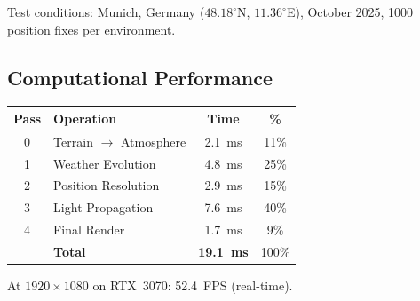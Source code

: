 \documentclass[10pt,twocolumn]{article}
\theoremstyle{definition}
\theoremstyle{remark}
\begin{document}
Test conditions: Munich, Germany
($48.18^\circ$N, $11.36^\circ$E), October 2025, 1000
position fixes per environment.

\subsection{Computational Performance}\label{sec:perfval}

\begin{center}
\small
\begin{tabular}{@{}clcc@{}}
\toprule
\textbf{Pass} & \textbf{Operation} & \textbf{Time}
  & \textbf{\%}\\
\midrule
0 & Terrain $\to$ Atmosphere & 2.1~ms & 11\%\\
1 & Weather Evolution & 4.8~ms & 25\%\\
2 & Position Resolution & 2.9~ms & 15\%\\
3 & Light Propagation & 7.6~ms & 40\%\\
4 & Final Render & 1.7~ms & 9\%\\
\midrule
& \textbf{Total} & \textbf{19.1~ms} & 100\%\\
\bottomrule
\end{tabular}
\end{center}

At $1920\times 1080$ on RTX~3070: 52.4~FPS (real-time).
\end{document}
